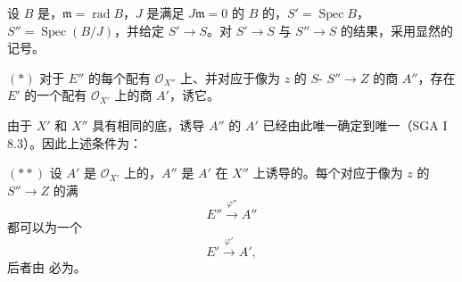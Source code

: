 设 $B$ 是，$\mathfrak m=\operatorname{rad}B$，$J$ 是满足 $J\mathfrak m=0$ 的 $B$ 的，$S'=\operatorname{Spec}B$，$S''=\operatorname{Spec}(B/J)$，并给定 $S'\to S$。对 $S'\to S$ 与 $S''\to S$ 的结果，采用显然的记号。

$(*)$ 对于 $E''$ 的每个配有 $\mathcal O_{X''}$ 上、并对应于像为 $z$ 的 $S$- $S''\to Z$ 的商 $A''$，存在 $E'$ 的一个配有 $\mathcal O_{X'}$ 上的商 $A'$，诱它。

由于 $X'$ 和 $X''$ 具有相同的底，诱导 $A''$ 的 $A'$ 已经由此唯一确定到唯一（SGA I 8.3）。因此上述条件为：

$(**)$ 设 $A'$ 是 $\mathcal O_{X'}$ 上的，$A''$ 是 $A'$ 在 $X''$ 上诱导的。每个对应于像为 $z$ 的 $S''\to Z$ 的满
\[
E''\xrightarrow{\varphi''}A''
\]
都可以为一个
\[
E'\xrightarrow{\varphi'}A',
\]
后者由 必为。

